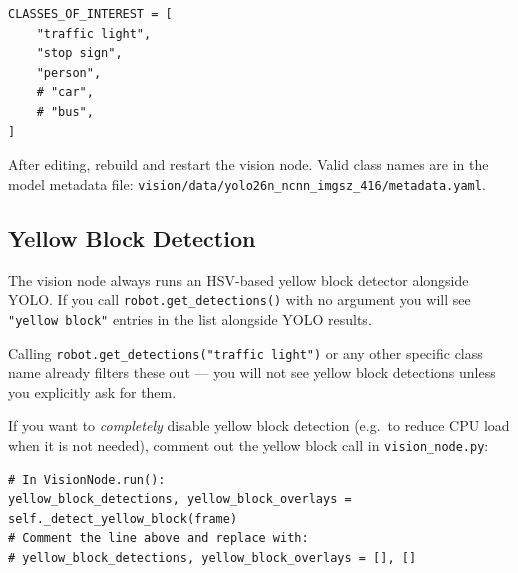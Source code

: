 \documentclass{ol-softwaremanual}
\begin{document}
\begin{verbatim}
CLASSES_OF_INTEREST = [
    "traffic light",
    "stop sign",
    "person",
    # "car",
    # "bus",
]
\end{verbatim}

After editing, rebuild and restart the vision node.
Valid class names are in the model metadata file:
\texttt{vision/data/yolo26n\_ncnn\_imgsz\_416/metadata.yaml}.

\subsection{Yellow Block Detection}

The vision node always runs an HSV-based yellow block detector alongside YOLO.
If you call \texttt{robot.get\_detections()} with no argument you will see
\texttt{"yellow block"} entries in the list alongside YOLO results.

Calling \texttt{robot.get\_detections("traffic light")} or any other specific
class name already filters these out --- you will not see yellow block detections
unless you explicitly ask for them.

If you want to \emph{completely} disable yellow block detection (e.g.\ to reduce
CPU load when it is not needed), comment out the yellow block call in
\texttt{vision\_node.py}:

\begin{verbatim}
# In VisionNode.run():
yellow_block_detections, yellow_block_overlays = self._detect_yellow_block(frame)
# Comment the line above and replace with:
# yellow_block_detections, yellow_block_overlays = [], []
\end{verbatim}
\end{document}
